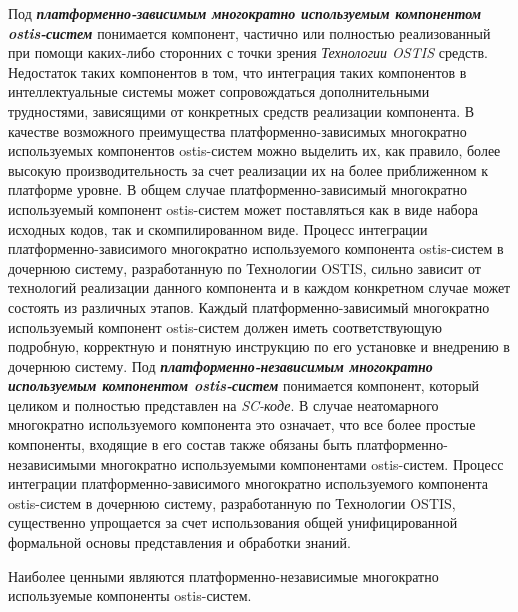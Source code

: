 Под \textbf{\textit{платформенно-зависимым многократно используемым компонентом ostis-систем}} понимается компонент, частично или полностью реализованный при помощи каких-либо сторонних с точки зрения \textit{Технологии OSTIS} средств. Недостаток таких компонентов в том, что интеграция таких компонентов в интеллектуальные системы может сопровождаться дополнительными трудностями, зависящими от конкретных средств реализации компонента. В качестве возможного преимущества платформенно-зависимых многократно используемых компонентов ostis-систем
можно выделить их, как правило, более высокую производительность за счет реализации их на более приближенном к платформе уровне. В общем случае платформенно-зависимый многократно используемый компонент ostis-систем может поставляться как в виде набора исходных кодов, так и скомпилированном виде. Процесс интеграции платформенно-зависимого
многократно используемого компонента ostis-систем в дочернюю систему, разработанную по Технологии OSTIS, сильно зависит от технологий реализации данного компонента и в каждом конкретном случае может состоять из различных этапов. Каждый платформенно-зависимый многократно используемый компонент ostis-систем должен иметь соответствующую подробную, корректную и понятную инструкцию по его установке и внедрению в дочернюю систему.
Под \textbf{\textit{платформенно-независимым многократно используемым компонентом ostis-систем}} понимается компонент, который целиком и полностью представлен на \textit{SC-коде}. В случае неатомарного многократно используемого компонента это означает, что все более простые компоненты, входящие в его состав также обязаны быть платформенно-независимыми многократно используемыми компонентами ostis-систем. Процесс интеграции платформенно-зависимого многократно используемого компонента ostis-систем в дочернюю систему, разработанную по Технологии OSTIS, существенно упрощается за счет использования общей унифицированной
формальной основы представления и обработки знаний.

Наиболее ценными являются платформенно-независимые многократно используемые компоненты ostis-систем.

